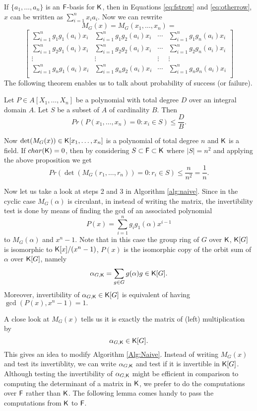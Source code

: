  If $\lbrace a_1, \ldots , a_n \rbrace$ is an ${\mathsf{F}}$-basis for ${\mathsf{K}}$, then in Equations
   \ref{eq:fstrow} and \ref{eq:otherrow}, $x$ can be written as $\sum_{i = 1}^nx_i
    a_i$. Now we can rewrite 
    $$
M_G(x) = M_G(x_1,\ldots,x_n) =  $$
$$
\begin{bmatrix}
\sum_{i = 1}^n g_1 g_1(a_i)x_i & \sum_{i = 1}^n g_1 g_2(a_i)x_i & \cdots & 
\sum_{i = 1}^n g_1 g_n(a_i)x_i \\
\sum_{i = 1}^n g_2 g_1(a_i)x_i & \sum_{i = 1}^n g_2 g_2(a_i)x_i & \cdots & 
\sum_{i = 1}^n g_2 g_n(a_i)x_i \\
\vdots		& \vdots	& \vdots & \vdots \\
\sum_{i = 1}^n g_n g_1(a_i)x_i & \sum_{i = 1}^n g_n g_2(a_i)x_i & \cdots & 
\sum_{i = 1}^n g_n g_n(a_i)x_i \\
\end{bmatrix}    
    $$ 
 The following theorem enables us to talk about probability of success (or failure).
 \begin{proposition}\cite[Proposition 98]{Zippel} \label{thm:zippel}
Let $P \in A[X_1, \ldots, X_n]$ be a polynomial with total degree $D$ over an integral domain $A$. Let $S$ be a subset of $A$ of cardinality $B$. Then $$Pr(P(x_1, \ldots , x_n)=0:x_i \in S) \leq \dfrac{D}{B}.$$
\end{proposition}

Now $\det(M_G(x)) \in {\mathsf{K}}[x_1, \ldots , x_n]$ is a polynomial of total degree $n$ and ${\mathsf{K}}$ is a field. If $char({\mathsf{K}}) =0$, then by considering $S \subset {\mathsf{F}} \subset {\mathsf{K}}$ where $|S| = n^2$ and applying the above proposition we get $$Pr(\det(M_G(r_1,\ldots , r_n)) = 0 : r_i \in S)\leq \dfrac{n}{n^2}= \dfrac{1}{n}.$$
 
Now let us take a look at steps 2 and 3 in Algorithm \ref{alg:naive}. Since in the cyclic case $M_G(\alpha)$ is circulant,
 in \cite{Giesbrecht} instead of writing the matrix, the invertibility test is done by means of finding the gcd of an 
 associated polynomial 
$$P(x) = \sum_{i = 1}^n g_ig_1(\alpha)x^{i-1}$$ 
 to $M_G(\alpha)$ and $x^n-1$. Note that in this case the group ring of $G$ over ${\mathsf{K}}$, ${\mathsf{K}}[G]$ is isomorphic to ${\mathsf{K}}[x]/(x^n-1)$,
 $P(x)$ is the isomorphic copy of the orbit sum of $\alpha$ over ${\mathsf{K}}[G]$, namely
 $$\alpha_{G,{\mathsf{K}}} = \sum_{g \in G} g(\alpha)g \in {\mathsf{K}}[G].$$
 Moreover, invertibility of $\alpha_{G,{\mathsf{K}}}\in {\mathsf{K}}[G]$ is equivalent of having $\gcd (P(x),x^n-1) =1.$
 
 A close look at $M_G(x)$ tells us it is exactly the matrix of (left) multiplication by $$\alpha_{G,{\mathsf{K}}} \in {\mathsf{K}}[G].$$  This gives an idea to modify Algorithm \ref{Alg:Naive}. Instead of writing $M_G(x)$ and test its  invertiblity, 
 we can write $\alpha_{G,{\mathsf{K}}}$ and test if it is invertible in ${\mathsf{K}}[G]$. Although testing the invertibility of $\alpha_{G,{\mathsf{K}}}$ might be efficient in
 comparison to computing the determinant of a matrix in ${\mathsf{K}}$, we prefer to do the computations over ${\mathsf{F}}$ rather than ${\mathsf{K}}$. The  following lemma
 comes handy to pass the computations from ${\mathsf{K}}$ to ${\mathsf{F}}$.


